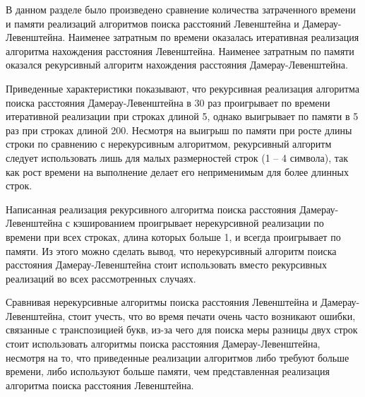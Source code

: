 В данном разделе было произведено сравнение количества затраченного времени и памяти реализаций алгоритмов поиска расстояний Левенштейна и Дамерау-Левенштейна.
Наименее затратным по времени оказалась итеративная реализация алгоритма нахождения расстояния Левенштейна.
Наименее затратным по памяти оказался рекурсивный алгоритм нахождения расстояния Дамерау-Левенштейна.

Приведенные характеристики показывают, что рекурсивная реализация алгоритма поиска расстояния Дамерау-Левенштейна в 30 раз проигрывает по времени итеративной реализации при строках длиной 5, однако выигрывает по памяти в 5 раз при строках длиной 200.
Несмотря на выигрыш по памяти при росте длины строки по сравнению с нерекурсивным алгоритмом, рекурсивный алгоритм следует использовать лишь для малых размерностей строк (1 -- 4 символа), так как рост времени на выполнение делает его неприменимым для более длинных строк.

Написанная реализация рекурсивного алгоритма поиска расстояния Дамерау-Левенштейна с кэшированием проигрывает нерекурсивной реализации по времени при всех строках, длина которых больше 1, и всегда проигрывает по памяти.
Из этого можно сделать вывод, что нерекурсивный алгоритм поиска расстояния Дамерау-Левенштейна стоит использовать вместо рекурсивных реализаций во всех рассмотренных случаях.

Сравнивая нерекурсивные алгоритмы поиска расстояния Левенштейна и Дамерау-Левенштейна, стоит учесть, что во время печати очень часто возникают ошибки, связанные с транспозицией букв, из-за чего для поиска меры разницы двух строк стоит использовать алгоритмы поиска расстояния Дамерау-Левенштейна, несмотря на то, что приведенные реализации алгоритмов либо требуют больше времени, либо используют больше памяти, чем представленная реализация алгоритма поиска расстояния Левенштейна.

